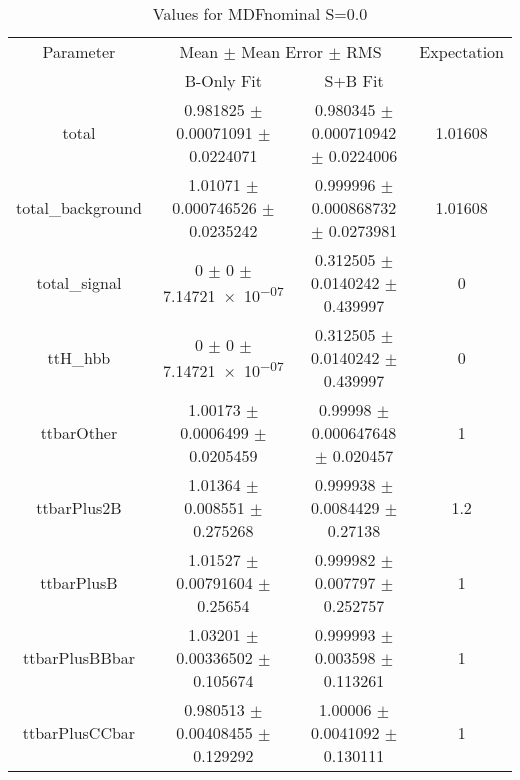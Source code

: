 \begin{table}
\centering
\caption{Values for MDFnominal S=0.0}
\begin{tabular}{cccc}
\toprule
Parameter & \multicolumn{2}{c}{Mean $\pm$ Mean Error $\pm$ RMS} & Expectation\\
 & B-Only Fit & S+B Fit & \\
\midrule
total & \num{0.981825} $\pm$ \num{0.00071091} $\pm$ \num{0.0224071} & \num{0.980345} $\pm$ \num{0.000710942} $\pm$ \num{0.0224006} & \num{1.01608}\\
total\_background & \num{1.01071} $\pm$ \num{0.000746526} $\pm$ \num{0.0235242} & \num{0.999996} $\pm$ \num{0.000868732} $\pm$ \num{0.0273981} & \num{1.01608}\\
total\_signal & \num{0} $\pm$ \num{0} $\pm$ \num{7.14721e-07} & \num{0.312505} $\pm$ \num{0.0140242} $\pm$ \num{0.439997} & \num{0}\\
ttH\_hbb & \num{0} $\pm$ \num{0} $\pm$ \num{7.14721e-07} & \num{0.312505} $\pm$ \num{0.0140242} $\pm$ \num{0.439997} & \num{0}\\
ttbarOther & \num{1.00173} $\pm$ \num{0.0006499} $\pm$ \num{0.0205459} & \num{0.99998} $\pm$ \num{0.000647648} $\pm$ \num{0.020457} & \num{1}\\
ttbarPlus2B & \num{1.01364} $\pm$ \num{0.008551} $\pm$ \num{0.275268} & \num{0.999938} $\pm$ \num{0.0084429} $\pm$ \num{0.27138} & \num{1.2}\\
ttbarPlusB & \num{1.01527} $\pm$ \num{0.00791604} $\pm$ \num{0.25654} & \num{0.999982} $\pm$ \num{0.007797} $\pm$ \num{0.252757} & \num{1}\\
ttbarPlusBBbar & \num{1.03201} $\pm$ \num{0.00336502} $\pm$ \num{0.105674} & \num{0.999993} $\pm$ \num{0.003598} $\pm$ \num{0.113261} & \num{1}\\
ttbarPlusCCbar & \num{0.980513} $\pm$ \num{0.00408455} $\pm$ \num{0.129292} & \num{1.00006} $\pm$ \num{0.0041092} $\pm$ \num{0.130111} & \num{1}\\
\bottomrule
\end{tabular}
\end{table}